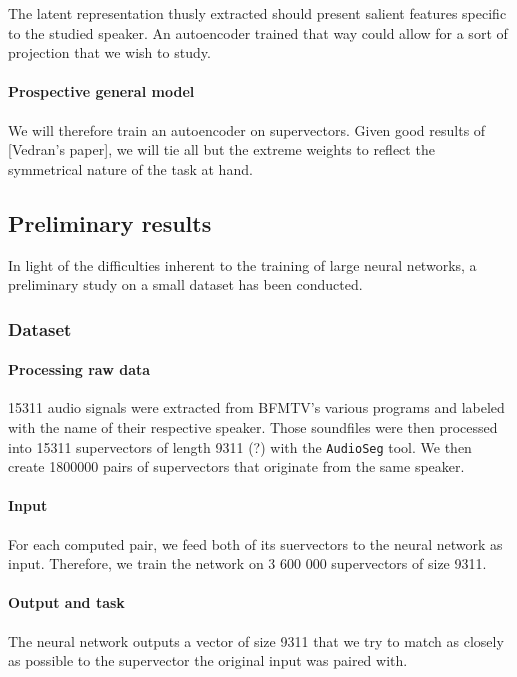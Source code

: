 \documentclass[conference]{IEEEtran}
\begin{document}
The latent representation thusly extracted should present salient features
specific to the studied speaker. An autoencoder trained that way could allow for
a sort of projection that we wish to study.

\paragraph{Prospective general model}

We will therefore train an autoencoder on supervectors. Given good results of
[Vedran's paper], we will tie all but the extreme weights to reflect the
symmetrical nature of the task at hand.

\subsection{Preliminary results}

In light of the difficulties inherent to the training of large neural networks,
a preliminary study on a small dataset has been conducted.

\subsubsection{Dataset}

\paragraph{Processing raw data}

15311 audio signals were extracted from BFMTV's various programs and labeled
with the name of their respective speaker. Those soundfiles were then processed
into 15311 supervectors of length 9311 (?) with the \texttt{AudioSeg} tool.
We then create 1800000 pairs of supervectors that originate from the same
speaker.

\paragraph{Input}

For each computed pair, we feed both of its suervectors to the neural network as
input. Therefore, we train the network on 3 600 000 supervectors of size 9311.

\paragraph{Output and task}

The neural network outputs a vector of size 9311 that we try to match as closely
as possible to the supervector the original input was paired with.

\appendix

\printbibliography
\end{document}
